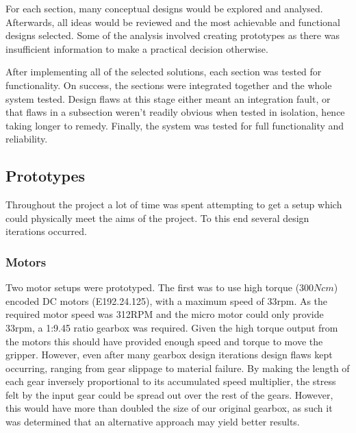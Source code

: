 \documentclass[conference]{IEEEtran}
\begin{document}
For each section, many conceptual designs would be explored and analysed. Afterwards, all ideas would be reviewed and the most achievable and functional designs selected. Some of the analysis involved creating prototypes as there was insufficient information to make a practical decision otherwise.

After implementing all of the selected solutions, each section was tested for functionality. On success, the sections were integrated together and the whole system tested. Design flaws at this stage either meant an integration fault, or that flaws in a subsection weren't readily obvious when tested in isolation, hence taking longer to remedy. Finally, the system was tested for full functionality and reliability.


\subsection{Prototypes}\label{prototypes}
Throughout the project a lot of time was spent attempting to get a setup which could physically meet the aims of the project. To this end several design iterations occurred.

\subsubsection{Motors}
Two motor setups were prototyped. The first was to use high torque ($300Ncm$) encoded DC motors (E192.24.125), with a maximum speed of 33rpm. As the required motor speed was 312RPM and the micro motor could only provide 33rpm, a 1:9.45 ratio gearbox was required. Given the high torque output from the motors this should have provided enough speed and torque to move the gripper. However, even after many gearbox design iterations design flaws kept occurring, ranging from gear slippage to material failure. By making the length of each gear inversely proportional to its accumulated speed multiplier, the stress felt by the input gear could be spread out over the rest of the gears. However, this would have more than doubled the size of our original gearbox, as such it was determined that an alternative approach may yield better results.
\end{document}

